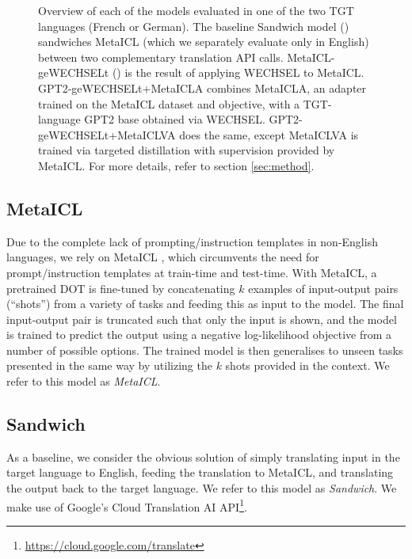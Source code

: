 \documentclass[11pt]{article}
\begin{document}
\begin{figure}[ht]
	\caption{Overview of each of the models evaluated in one of the two TGT
		languages (French or German). The baseline
		\textcolor[HTML]{79d6ae}{Sandwich} model () sandwiches
		\textcolor[HTML]{332345}{MetaICL} \citep{min_metaicl_2022} (which we
		separately evaluate only in English) between two complementary translation
		API calls. \textcolor[HTML]{38AAAC}{MetaICL-geWECHSELt}
		() is the result of applying WECHSEL
		\citep{minixhofer_wechsel_2022} to MetaICL.
		\textcolor[HTML]{357aa2}{GPT2-geWECHSELt+MetaICLA} combines
		\textcolor{Dandelion}{MetaICLA}, an adapter trained on the MetaICL dataset
		and objective, with a TGT-language GPT2 base obtained via WECHSEL.
		\textcolor[HTML]{40498e}{GPT2-geWECHSELt+MetaICLVA} does the same, except
		\textcolor{Dandelion}{MetaICLVA} is trained via targeted distillation with
		supervision provided by MetaICL. For more details, refer to section
		\ref{sec:method}.}
\end{figure}

\subsection{MetaICL}

Due to the complete lack of prompting/instruction templates in non-English languages, we rely on
MetaICL \citep{min_metaicl_2022}, which circumvents the need for prompt/instruction templates at
train-time and test-time. With MetaICL, a pretrained DOT is fine-tuned by concatenating $k$ examples
of input-output pairs (``shots'') from a variety of tasks and feeding this as input to the model.
The final input-output pair is truncated such that only the input is shown, and the model is trained
to predict the output using a negative log-likelihood objective from a number of possible options.
The trained model is then generalises to unseen tasks presented in the same way by utilizing the $k$
shots provided in the context.  We refer to this model as \textit{MetaICL}.

\subsection{Sandwich}

As a baseline, we consider the obvious solution of simply translating input in the target language
to English, feeding the translation to MetaICL, and translating the output back to the target
language. We refer to this model as \textit{Sandwich}. We make use of Google's Cloud Translation AI
API\footnote{\href{https://cloud.google.com/translate}{https://cloud.google.com/translate}}.
\end{document}
